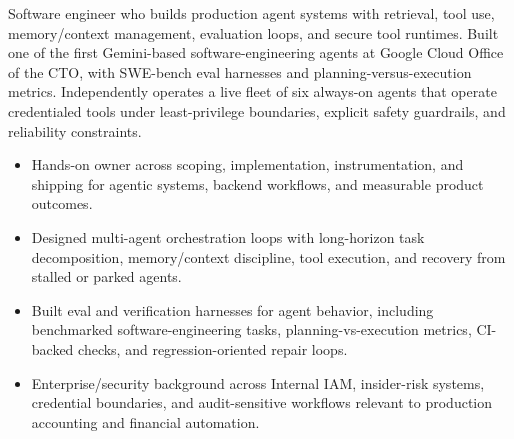 


Software engineer who builds production agent systems with retrieval, tool use, memory/context management, evaluation loops, and secure tool runtimes. Built one of the first Gemini-based software-engineering agents at Google Cloud Office of the CTO, with SWE-bench eval harnesses and planning-versus-execution metrics. Independently operates a live fleet of six always-on agents that operate credentialed tools under least-privilege boundaries, explicit safety guardrails, and reliability constraints.
\begin{itemize}
  \item Hands-on owner across scoping, implementation, instrumentation, and shipping for agentic systems, backend workflows, and measurable product outcomes.
  \item Designed multi-agent orchestration loops with long-horizon task decomposition, memory/context discipline, tool execution, and recovery from stalled or parked agents.
  \item Built eval and verification harnesses for agent behavior, including benchmarked software-engineering tasks, planning-vs-execution metrics, CI-backed checks, and regression-oriented repair loops.
  \item Enterprise/security background across Internal IAM, insider-risk systems, credential boundaries, and audit-sensitive workflows relevant to production accounting and financial automation.
\end{itemize}







